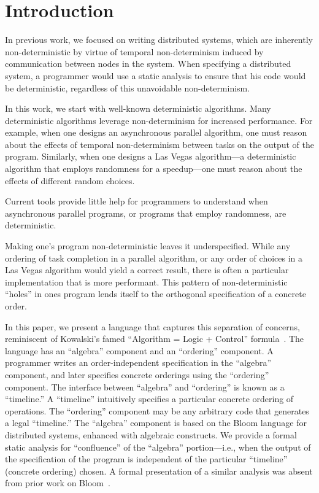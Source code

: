 \section{Introduction}
\label{sec:intro}

In previous work, we focused on writing distributed systems, which are inherently non-deterministic by virtue of temporal non-determinism induced by communication between nodes in the system.  When specifying a distributed system, a programmer would use a static analysis to ensure that his code would be deterministic, regardless of this unavoidable non-determinism.~\cite{cidr11}

In this work, we start with well-known deterministic algorithms.  Many deterministic algorithms leverage non-determinism for increased performance.  For example, when one designs an asynchronous parallel algorithm, one must reason about the effects of temporal non-determinism between tasks on the output of the program.  Similarly, when one designs a Las Vegas algorithm---a deterministic algorithm that employs randomness for a speedup---one must reason about the effects of different random choices.

Current tools provide little help for programmers to understand when asynchronous parallel programs, or programs that employ randomness, are deterministic.

Making one's program non-deterministic leaves it underspecified.  While any ordering of task completion in a parallel algorithm, or any order of choices in a Las Vegas algorithm would yield a correct result, there is often a particular implementation that is more performant.  This pattern of non-deterministic ``holes'' in ones program lends itself to the orthogonal specification of a concrete order.

In this paper, we present a language that captures this separation of concerns, reminiscent of Kowalski's famed ``Algorithm = Logic + Control'' formula~\cite{alc}.  The language has an ``algebra'' component and an ``ordering'' component.  A programmer writes an order-independent specification in the ``algebra'' component, and later specifies concrete orderings using the ``ordering'' component.  The interface between ``algebra'' and ``ordering'' is known as a ``timeline.''  A ``timeline'' intuitively specifies a particular concrete ordering of operations.  The ``ordering'' component may be any arbitrary code that generates a legal ``timeline.''  The ``algebra'' component is based on the Bloom language for distributed systems, enhanced with algebraic constructs.  We provide a formal static analysis for ``confluence'' of the ``algebra'' portion---i.e., when the output of the specification of the program is independent of the particular ``timeline'' (concrete ordering) chosen.  A formal presentation of a similar analysis was absent from prior work on Bloom~\cite{this-tr}.
